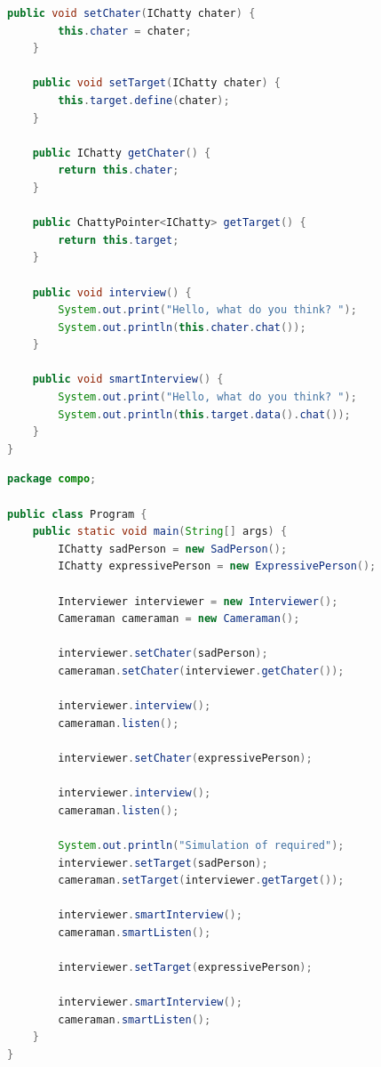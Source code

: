 \documentclass[11pt,a4paper,openany,oneside]{book}
\begin{document}
\begin{appendices}
\begin{lstlisting}[language=Java, frame=single, caption=Interviewer]
    public void setChater(IChatty chater) {
        this.chater = chater;
    }

    public void setTarget(IChatty chater) {
        this.target.define(chater);
    }

    public IChatty getChater() {
        return this.chater;
    }

    public ChattyPointer<IChatty> getTarget() {
        return this.target;
    }

    public void interview() {
        System.out.print("Hello, what do you think? ");
        System.out.println(this.chater.chat());
    }

    public void smartInterview() {
        System.out.print("Hello, what do you think? ");
        System.out.println(this.target.data().chat());
    }
}
\end{lstlisting}

\clearpage

\begin{lstlisting}[language=Java, frame=single, caption=Program]
package compo;

public class Program {
    public static void main(String[] args) {
        IChatty sadPerson = new SadPerson();
        IChatty expressivePerson = new ExpressivePerson();

        Interviewer interviewer = new Interviewer();
        Cameraman cameraman = new Cameraman();

        interviewer.setChater(sadPerson);
        cameraman.setChater(interviewer.getChater());

        interviewer.interview();
        cameraman.listen();

        interviewer.setChater(expressivePerson);

        interviewer.interview();
        cameraman.listen();

        System.out.println("Simulation of required");
        interviewer.setTarget(sadPerson);
        cameraman.setTarget(interviewer.getTarget());

        interviewer.smartInterview();
        cameraman.smartListen();

        interviewer.setTarget(expressivePerson);

        interviewer.smartInterview();
        cameraman.smartListen();
    }
}
\end{lstlisting}


\end{appendices}
\end{document}
